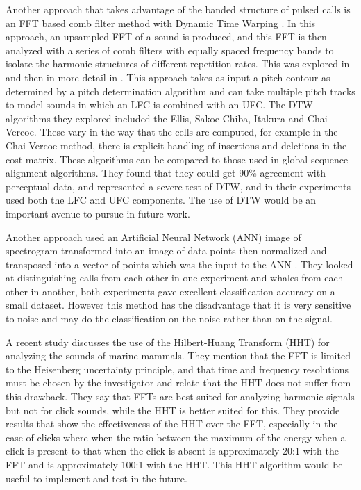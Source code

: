 \documentclass[12pt,oneside]{book}
\begin{document}
Another approach that takes advantage of the banded structure of
pulsed calls is an FFT based comb filter method with Dynamic Time
Warping  \cite{brown2006classifying}.  In this approach, an upsampled
FFT of a sound is produced, and this FFT is then analyzed with a
series of comb filters with equally spaced frequency bands to isolate
the harmonic structures of different repetition rates. This was
explored in \cite{brown2006classifying} and then in more detail in
\cite{brown2007dtw}.  This approach takes as input a pitch contour as
determined by a pitch determination algorithm and can take multiple
pitch tracks to model sounds in which an LFC is combined with an UFC.
The DTW algorithms they explored included the Ellis, Sakoe-Chiba,
Itakura and Chai-Vercoe.  These vary in the way that the cells are
computed, for example in the Chai-Vercoe method, there is explicit
handling of insertions and deletions in the cost matrix.  These
algorithms can be compared to those used in global-sequence alignment
algorithms.  They found that they could get 90\% agreement with
perceptual data, and represented a severe test of DTW, and in their
experiments used both the LFC and UFC components.  The use of DTW
would be an important avenue to pursue in future work.

Another approach used an Artificial Neural Network (ANN) image of
spectrogram transformed into an image of data points then normalized
and transposed into a vector of points which was the input to the ANN
\cite{gaetz1993neural}.  They looked at distinguishing calls from each
other in one experiment and whales from each other in another, both
experiments gave excellent classification accuracy on a small dataset.
However this method has the disadvantage that it is very sensitive to
noise and may do the classification on the noise rather than on the
signal.

A recent study \cite{adam2006hilbert} discusses the use of the
Hilbert-Huang Transform (HHT) for analyzing the sounds of marine
mammals.  They mention that the FFT is limited to the Heisenberg
uncertainty principle, and that time and frequency resolutions must be
chosen by the investigator and relate that the HHT does not suffer
from this drawback.  They say that FFTs are best suited for analyzing
harmonic signals but not for click sounds, while the HHT is better
suited for this.  They provide results that show the effectiveness of
the HHT over the FFT, especially in the case of clicks where when the
ratio between the maximum of the energy when a click is present to
that when the click is absent is approximately 20:1 with the FFT and
is approximately 100:1 with the HHT.  This HHT algorithm would be
useful to implement and test in the future.
\end{document}
